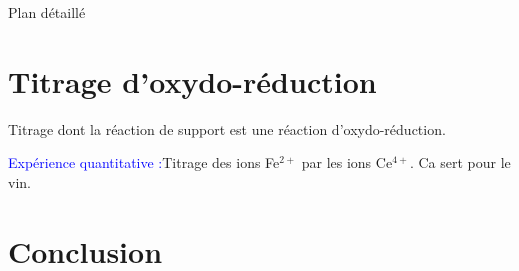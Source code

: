 \begin{reportBlock}{Plan détaillé}
\section{Titrage d'oxydo-réduction}
Titrage dont la réaction de support est une réaction d'oxydo-réduction.

\textcolor{blue}{Expérience quantitative :}Titrage des ions Fe$^{2+}$ par les ions Ce$^{4+}$. Ca sert pour le vin.

\section*{Conclusion} 

\end{reportBlock}

